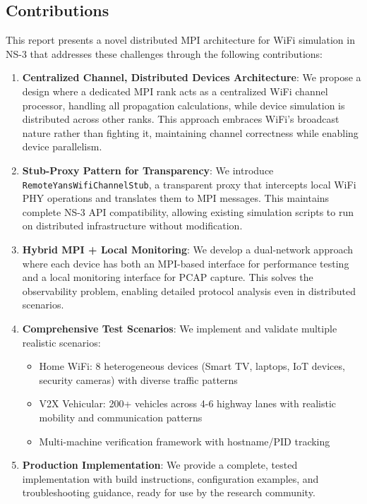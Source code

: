 \subsection{Contributions}

This report presents a novel distributed MPI architecture for WiFi simulation in NS-3 that addresses these challenges through the following contributions:

\begin{enumerate}
    \item \textbf{Centralized Channel, Distributed Devices Architecture}: We propose a design where a dedicated MPI rank acts as a centralized WiFi channel processor, handling all propagation calculations, while device simulation is distributed across other ranks. This approach embraces WiFi's broadcast nature rather than fighting it, maintaining channel correctness while enabling device parallelism.
    
    \item \textbf{Stub-Proxy Pattern for Transparency}: We introduce \texttt{RemoteYansWifiChannelStub}, a transparent proxy that intercepts local WiFi PHY operations and translates them to MPI messages. This maintains complete NS-3 API compatibility, allowing existing simulation scripts to run on distributed infrastructure without modification.
    
    \item \textbf{Hybrid MPI + Local Monitoring}: We develop a dual-network approach where each device has both an MPI-based interface for performance testing and a local monitoring interface for PCAP capture. This solves the observability problem, enabling detailed protocol analysis even in distributed scenarios.
    
    \item \textbf{Comprehensive Test Scenarios}: We implement and validate multiple realistic scenarios:
    \begin{itemize}
        \item Home WiFi: 8 heterogeneous devices (Smart TV, laptops, IoT devices, security cameras) with diverse traffic patterns
        \item V2X Vehicular: 200+ vehicles across 4-6 highway lanes with realistic mobility and communication patterns
        \item Multi-machine verification framework with hostname/PID tracking
    \end{itemize}
    
    \item \textbf{Production Implementation}: We provide a complete, tested implementation with build instructions, configuration examples, and troubleshooting guidance, ready for use by the research community.
\end{enumerate}

